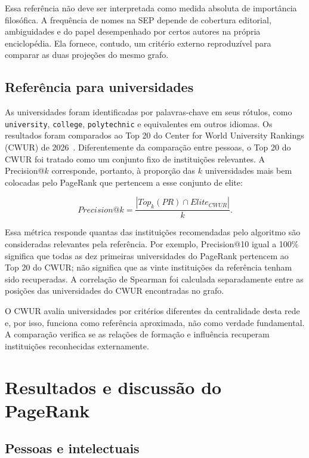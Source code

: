 \documentclass[10pt,a4paper]{article}
\begin{document}
Essa referência não deve ser interpretada como medida absoluta de importância filosófica. A frequência de nomes na SEP depende de cobertura editorial, ambiguidades e do papel desempenhado por certos autores na própria enciclopédia. Ela fornece, contudo, um critério externo reproduzível para comparar as duas projeções do mesmo grafo.

\subsection{Referência para universidades}

As universidades foram identificadas por palavras-chave em seus rótulos, como \texttt{university}, \texttt{college}, \texttt{polytechnic} e equivalentes em outros idiomas. Os resultados foram comparados ao Top 20 do Center for World University Rankings (CWUR) de 2026~\cite{cwur2026}. Diferentemente da comparação entre pessoas, o Top 20 do CWUR foi tratado como um conjunto fixo de instituições relevantes. A Precision@$k$ corresponde, portanto, à proporção das $k$ universidades mais bem colocadas pelo PageRank que pertencem a esse conjunto de elite:

\begin{equation}
Precision@k=\frac{|Top_k(PR)\cap Elite_{CWUR}|}{k}.
\end{equation}

Essa métrica responde quantas das instituições recomendadas pelo algoritmo são consideradas relevantes pela referência. Por exemplo, Precision@10 igual a 100\% significa que todas as dez primeiras universidades do PageRank pertencem ao Top 20 do CWUR; não significa que as vinte instituições da referência tenham sido recuperadas. A correlação de Spearman foi calculada separadamente entre as posições das universidades do CWUR encontradas no grafo.

O CWUR avalia universidades por critérios diferentes da centralidade desta rede e, por isso, funciona como referência aproximada, não como verdade fundamental. A comparação verifica se as relações de formação e influência recuperam instituições reconhecidas externamente.

\section{Resultados e discussão do PageRank}

\subsection{Pessoas e intelectuais}
\end{document}

